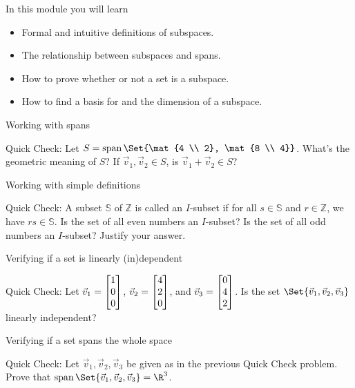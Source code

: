 	\begin{bookonly}\singlegrid\end{bookonly}

\begin{module}

	In this module you will learn
	\begin{itemize}
		\item Formal and intuitive definitions of subspaces.
		\item The relationship between subspaces and spans.
		\item How to prove whether or not a set is a subspace.
		\item How to find a basis for and the dimension of a subspace.
	\end{itemize}

	\begin{beforeyouread}
		\item Working with spans

		\item[] Quick Check: Let $S=\Span\Set{\mat{4 \\ 2}, \mat{8 \\ 4}}$. What's the
			geometric meaning of $S$? If $\vec v_{1},\vec v_{2}\in S$, is $\vec v_{1}
			+\vec v_{2}\in S$?

		\item Working with simple definitions

		\item[] Quick Check: A subset $\mathbb{S}$ of $\mathbb{Z}$ is called an $I$-subset
			if for all $s\in\mathbb{S}$ and $r\in\mathbb{Z}$, we have $rs\in\mathbb{S}$.
			Is the set of all even numbers an $I$-subset? Is the set of all odd numbers
			an $I$-subset? Justify your answer.

		\item Verifying if a set is linearly (in)dependent

		\item[] Quick Check: Let $\vec v_{1}=\mat{1 \\ 0 \\ 0}$, $\vec v_{2}=\mat{4 \\ 2 \\ 0}$,
			and $\vec v_{3} = \mat{0 \\ 4 \\ 2}$. Is the set $\Set{\vec v_1, \vec v_2, \vec v_3}$
			linearly independent?

		\item Verifying if a set spans the whole space

		\item[] Quick Check: Let $\vec v_{1},\vec v_{2}, \vec v_{3}$ be given as in
			the previous Quick Check problem. Prove that $\Span\Set{\vec v_1,\vec v_2,\vec v_3}
			=\R^{3}$.
	\end{beforeyouread}

	
	
\end{module}
	\bookonlynewpage
